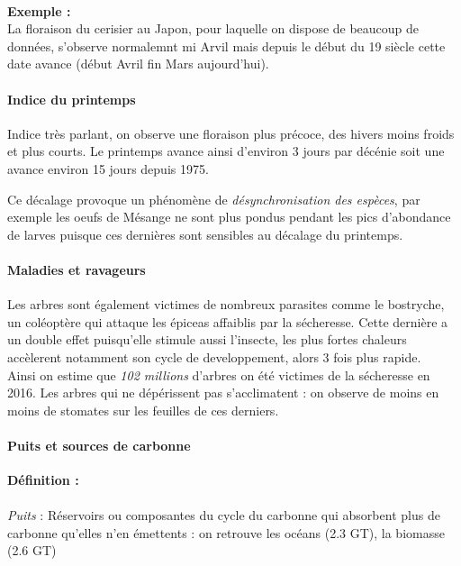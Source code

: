 \documentclass {article}
\begin{document}
\paragraph{}
\textbf{Exemple :}
\\ La floraison du cerisier au Japon, pour laquelle on dispose de beaucoup de données, s'observe normalemnt mi Arvil mais depuis le début du 19 siècle cette date avance (début Avril fin Mars aujourd'hui).

\paragraph{Indice du printemps} Indice très parlant, on observe une floraison plus précoce, des hivers moins froids et plus courts.
Le printemps avance ainsi d'environ 3 jours par décénie soit une avance environ 15 jours depuis 1975.

Ce décalage provoque un phénomène de \emph{désynchronisation des espèces}, par exemple les oeufs de Mésange ne sont plus pondus pendant les pics d'abondance de larves puisque ces dernières sont sensibles au décalage du printemps.

\paragraph{Maladies et ravageurs}
Les arbres sont également victimes de nombreux parasites comme le bostryche, un coléoptère qui attaque les épiceas affaiblis par la sécheresse. Cette dernière a un double effet puisqu'elle stimule aussi l'insecte, les plus fortes chaleurs accèlerent notamment son cycle de developpement, alors 3 fois plus rapide.
\\ Ainsi on estime que \emph{102 millions} d'arbres on été victimes de la sécheresse en 2016.
Les arbres qui ne dépérissent pas s'acclimatent : on observe de moins en moins de stomates sur les feuilles de ces derniers.


\paragraph{Puits et sources de carbonne}

\textbf{Définition :} 
\paragraph{}
\textit{Puits} : Réservoirs ou composantes du cycle du carbonne qui absorbent plus de carbonne qu'elles n'en émettents : on retrouve les océans (2.3 GT), la biomasse (2.6 GT)
\end{document}
